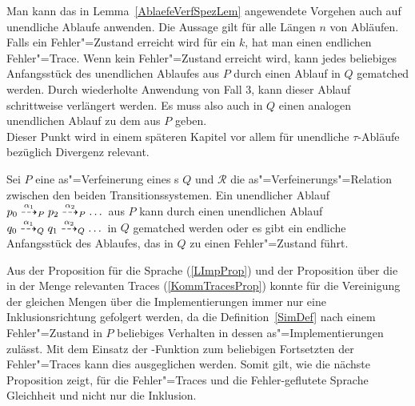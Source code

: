 Man kann das in Lemma~\ref{AblaefeVerfSpezLem} angewendete Vorgehen auch auf
unendliche Ablaufe anwenden. Die Aussage gilt für alle Längen $n$ von Abläufen.
Falls ein Fehler"=Zustand erreicht wird für ein $k$, hat man einen endlichen
Fehler"=Trace. Wenn kein Fehler"=Zustand erreicht wird, kann jedes beliebiges
Anfangsstück des unendlichen Ablaufes aus $P$ durch einen Ablauf in $Q$
gematched werden. Durch wiederholte Anwendung von Fall 3, kann dieser Ablauf
schrittweise verlängert werden. Es muss also auch in $Q$ einen analogen
unendlichen Ablauf zu dem aus $P$ geben.\\
Dieser Punkt wird in einem späteren Kapitel vor allem für unendliche
$\tau$-Abläufe bezüglich Divergenz relevant.

\begin{Kor}
  \label{unendlAblKor}
  Sei $P$ eine as"=Verfeinerung eines \MEIO{}s $Q$ und $\mathcal{R}$ die
  as"=Verfeinerungs"=Relation zwischen den beiden Transitionssystemen. Ein
  unendlicher Ablauf $p_0 \may[\alpha _1]_P p_2 \may[\alpha _2]_P \dots$ aus
  $P$ kann durch einen unendlichen Ablauf $q_0 \may[\alpha _1]_Q q_1
  \may[\alpha _2]_Q \dots$ in $Q$ gematched werden oder es gibt ein endliche
  Anfangsstück des Ablaufes, das in $Q$ zu einen Fehler"=Zustand führt.
\end{Kor}

Aus der Proposition für die Sprache (\ref{LImpProp}) und der Proposition über
die in der Menge \ET{} relevanten Traces (\ref{KommTracesProp}) konnte für die
Vereinigung der gleichen Mengen über die Implementierungen immer nur eine
Inklusionsrichtung gefolgert werden, da die Definition~\ref{SimDef} nach einem
Fehler"=Zustand in $P$ beliebiges Verhalten in dessen as"=Implementierungen
zulässt. Mit dem Einsatz der \cont{}-Funktion zum beliebigen Fortsetzten der
Fehler"=Traces kann dies ausgeglichen werden. Somit gilt, wie die nächste
Proposition zeigt, für die Fehler"=Traces und die Fehler-geflutete Sprache
Gleichheit und nicht nur die Inklusion.

